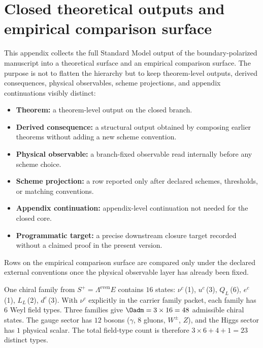 \section{Closed theoretical outputs and empirical comparison surface}
\label{app:global-particle-ledger}

This appendix collects the full Standard Model output of the boundary-polarized manuscript into a
theoretical surface and an empirical comparison surface. The purpose is not to flatten the
hierarchy but to keep theorem-level outputs, derived consequences, physical observables, scheme projections, and appendix continuations
visibly distinct:

\begin{tcolorbox}[colback=tfptblue!2, colframe=tfptblue!50, breakable,
    title={Status legend for the particle ledger}, colbacktitle=tfptblue!70]
\begin{itemize}[leftmargin=1.5em, topsep=3pt, itemsep=2pt]
\item \textbf{Theorem:} a theorem-level output on the closed branch.
\item \textbf{Derived consequence:} a structural output obtained by composing earlier theorems without adding a new scheme convention.
\item \textbf{Physical observable:} a branch-fixed observable read internally before any scheme choice.
\item \textbf{Scheme projection:} a row reported only after declared schemes, thresholds, or matching conventions.
\item \textbf{Appendix continuation:} appendix-level continuation not needed for the closed core.
\item \textbf{Programmatic target:} a precise downstream closure target recorded without a claimed proof in the present version.
\end{itemize}
Rows on the empirical comparison surface are compared only under the declared external
conventions once the physical observable layer has already been fixed.
\end{tcolorbox}

\begin{remark}
\label{rem:counting-convention}
One chiral family from $S^+=\Lambda^{\mathrm{even}}E$ contains $16$ states:
$\nu^c$\,(1), $u^c$\,(3), $Q_L$\,(6), $e^c$\,(1), $L_L$\,(2), $d^c$\,(3).
With $\nu^c$ explicitly in the carrier family packet, each family has $6$ Weyl field types.
Three families give $\Oadm=3\times 16=48$ admissible chiral states.
The gauge sector has $12$ bosons ($\gamma$, $8$ gluons, $W^\pm$, $Z$), and the Higgs sector has
$1$ physical scalar. The total field-type count is therefore $3\times 6+4+1=23$ distinct types.
\end{remark}

